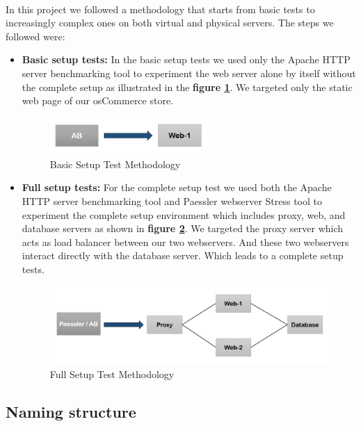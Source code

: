 \paragraph{}
In this project we followed a methodology that starts from basic tests to increasingly complex ones on both virtual and physical servers. The steps we followed were:
\begin{itemize}
    \item \textbf{Basic setup tests:}
 In the basic setup tests we used only the Apache HTTP server benchmarking tool to experiment the web server alone by itself without the complete setup as illustrated in the \textbf{figure \ref{fig:setupbasic}}. 
 We targeted only the static web page of our osCommerce store.
 \begin{figure}[H]
    \centering
    \includegraphics[width=6cm]{Pictures/simple.PNG}
    \caption{Basic Setup Test Methodology}
    \label{fig:setupbasic}
\end{figure}

\item \textbf{Full setup tests:}
 For the complete setup test we used both the Apache HTTP server benchmarking tool and Paessler webserver Stress tool to experiment the complete setup environment which includes proxy, web, and database servers as shown in \textbf{figure \ref{fig:setupfull}}. 
 We targeted the proxy server which acts as load balancer between our two webservers. And these two webservers interact directly with the database server. Which leads to a complete setup tests.   
 
 \begin{figure}[H]
    \centering
    \includegraphics[width=12cm]{Pictures/complex.PNG}
    \caption{Full Setup Test Methodology}
    \label{fig:setupfull}
\end{figure}
\end{itemize}

\subsection{Naming structure}
